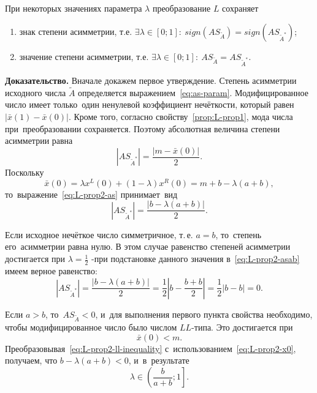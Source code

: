 \begin{prop}
\label{prop:L-prop2}
При некоторых значениях параметра $\lambda$ преобразование $L$ сохраняет
\begin{enumerate}
  \item знак степени асимметрии, т.е. $\exists \lambda \in [0;1]:\ sign(AS_{\tilde A})=sign(AS_{\tilde A^{*}})$;
  \item значение степени асимметрии, т.е. $\exists \lambda \in [0;1]:\ AS_{\tilde A}=AS_{\tilde A^{*}}$.
\end{enumerate}
\end{prop}
\textbf{Доказательство.} Вначале докажем первое утверждение. Степень асимметрии исходного числа $\tilde A$ определяется выражением~\eqref{eq:as-param}. Модифицированное число имеет только~один ненулевой коэффициент нечёткости, который равен $\left| \bar{x}\left( 1 \right)-\bar{x}\left( 0 \right) \right|$. Кроме того, согласно свойству~\ref{prop:L-prop1}, мода числа при~преобразовании сохраняется. Поэтому абсолютная величина степени асимметрии равна
\begin{equation}
\label{eq:L-prop2-as}
  \left| AS_{\tilde A^{*}} \right|=\frac{\left| m-\bar{x}\left( 0 \right) \right|}{2}.
\end{equation}
Поскольку
\begin{equation}
\label{eq:L-prop2-x0}
  \bar{x}\left( 0 \right)=\lambda {{x}^{L}}\left( 0 \right)+\left( 1-\lambda  \right){{x}^{R}}\left( 0 \right)=m+b-\lambda \left( a+b \right),
\end{equation}
то~выражение~\eqref{eq:L-prop2-as} принимает~вид
\begin{equation}
\label{eq:L-prop2-asab}
  \left| AS_{\tilde A^{*}} \right|=\frac{\left| b-\lambda \left( a+b \right) \right|}{2}.
\end{equation}

Если исходное нечёткое число симметричное, т.\,е. $a=b$, то~степень его~асимметрии равна нулю. В этом случае равенство степеней асимметрии достигается при $\displaystyle \lambda =\frac{1}{2}$ -при подстановке данного значения в~\eqref{eq:L-prop2-asab} имеем верное равенство:
\begin{equation*}
  \left| AS_{\tilde A^{*}} \right|=\frac{\left| b-\lambda \left( a+b \right) \right|}{2}=\frac{1}{2}\left| b-\frac{b+b}{2} \right|=\frac{1}{2}\left| b-b \right|=0.
\end{equation*}

Если $a>b$, то~$AS_{\tilde A}<0$, и~для выполнения первого пункта свойства необходимо, чтобы модифицированное число было числом $LL$-типа. Это достигается при
\begin{equation}
\label{eq:L-prop2-ll-inequality}
  \bar{x}\left( 0 \right)<m.
\end{equation}
Преобразовывая~\eqref{eq:L-prop2-ll-inequality} с~использованием~\eqref{eq:L-prop2-x0}, получаем, что $b-\lambda \left( a+b \right)<0$, и~в~результате 
\begin{equation*}
  \lambda \in \left( \frac{b}{a+b};1 \right].
\end{equation*}


